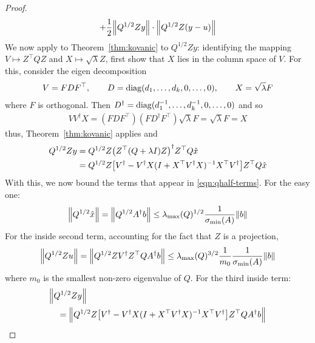 \documentclass[12pt]{article}
\begin{document}
\begin{proof}
\begin{align}
{        + \frac{1}{2} {\left\lVert Q^{1/2} Z y\right\rVert}}
            \cdot {\left\lVert Q^{1/2} Z (y - u)\right\rVert}
      \label{eqn:qhalf-terms}
  \end{align}
  We now apply to Theorem~\ref{thm:kovanic}
  to \(Q^{1/2} Z y\):
  identifying the mapping
  \(V \mapsto Z^\top Q Z\) and \(X \mapsto \sqrt{\lambda} Z\),
  first show that \(X\) lies in the column space of \(V\).
  For this, consider the eigen decomposition
  \begin{align*}
    V = F D F^\top,
      \qquad D = \operatorname{diag}(d_1, \ldots, d_k, 0, \ldots, 0),
      \qquad X = \sqrt{\lambda} F
  \end{align*}
  where \(F\) is orthogonal.
  Then \(D^\dagger = \operatorname{diag}(d_1 ^{-1}, \ldots, d_k ^{-1}, 0, \ldots, 0)\)
  and so
  \begin{align*}
    V V^\dagger X
      = (F D F^\top)(F D^\dagger F^\top) \sqrt{\lambda} F
      = \sqrt{\lambda} F
      = X
  \end{align*}
  thus, Theorem~\ref{thm:kovanic} applies and
  \begin{align*}
    Q^{1/2} Z y
      &= Q^{1/2} Z {\left(Z ^\top (Q+\lambda I) Z\right)}^\dagger Z^\top Q \hat{x} \\
      &= Q^{1/2} Z
          {\left[V^\dagger
            - V^\dagger X (I + X^\top V^\dagger X)^{-1} X^\top V^\dagger\right]}
            Z^\top Q \hat{x}
  \end{align*}
  With this, we now bound the terms that appear in \eqref{eqn:qhalf-terms}.
  For the easy one:
  \begin{align}
    {\left\lVert Q^{1/2} \hat{x}\right\rVert}
      = {\left\lVert Q^{1/2} A^\dagger b\right\rVert}
      \leq \lambda_{\max} (Q) ^{1/2}
          \frac{1}{\sigma_{\min} (A)}
          {\left\lVert b\right\rVert}
      \label{eqn:qhalf-left}
  \end{align}
  For the inside second term, accounting for the
  fact that \(Z\) is a projection,
  \begin{align}
    {\left\lVert Q^{1/2} Z u\right\rVert}
      = {\left\lVert Q^{1/2} Z V^\dagger Z^\top Q A ^\dagger b\right\rVert}
      \leq
        \lambda_{\max} (Q) ^{3/2}
          \frac{1}{m_0}
          \frac{1}{\sigma_{\min} (A)}
          {\left\lVert b\right\rVert}
      \label{eqn:qhalf-mid}
  \end{align}
  where \(m_0\) is the smallest non-zero eigenvalue of \(Q\).
  For the third inside term:
  \begin{align*}
    &\norm{Q^{1/2} Z y} \\
      &\quad= \norm{Q^{1/2} Z
          \bracks{V^\dagger
            - V^\dagger X(I + X^\top V^\dagger X)^{-1} X^\top V^\dagger}
          Z^\top Q A^\dagger b} \\

\end{align*}
\end{proof}
\end{document}
